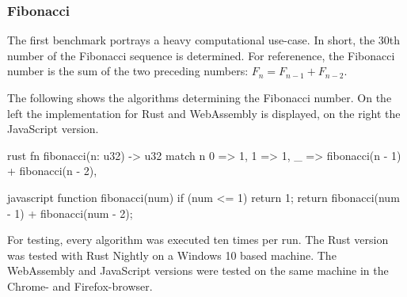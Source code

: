 \subsubsection{Fibonacci}
The first benchmark portrays a heavy computational use-case. In short, the 30th number of the Fibonacci sequence is determined. For referenence, the Fibonacci number is the sum of the two preceding numbers: $F_n = F_{n-1} + F_{n-2}$.

The following shows the algorithms determining the Fibonacci number. On the left the implementation for Rust and WebAssembly is displayed, on the right the JavaScript version.

\begin{listing}
\noindent
\begin{minipage}[t]{0.57\textwidth}
\begin{code}[]{rust}
fn fibonacci(n: u32) -> u32 {
    match n {
        0 => 1,
        1 => 1,
        _ => fibonacci(n - 1) + fibonacci(n - 2),
    }
}
\end{code}
\end{minipage}
\begin{minipage}[t]{0.4\textwidth}
\begin{code}[]{javascript}
function fibonacci(num) {
    if (num <= 1) return 1;
    return fibonacci(num - 1) + fibonacci(num - 2);
}
\end{code}
\end{minipage}
\caption{Fibonacci source code - Rust/Wasm - JS \cite{wasm:wat}}
\label{lst:wasm-code}
\end{listing}

\vspace{-0.2cm}
For testing, every algorithm was executed ten times per run. The Rust version was tested with Rust Nightly on a Windows 10 based machine. The WebAssembly and JavaScript versions were tested on the same machine in the Chrome- and Firefox-browser.

\begin{listing}
\begin{center}
\end{center}
\caption{Fibonacci Benchmark}
\label{lst:fibonacci-benchmark}
\end{listing}

